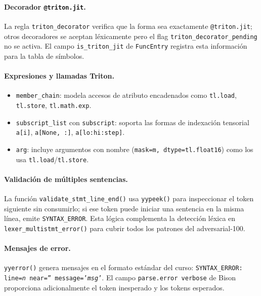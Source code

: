 \paragraph{Decorador \texttt{@triton.jit}.}
La regla \texttt{triton\_decorator} verifica que la forma sea exactamente
\texttt{@triton.jit}; otros decoradores se aceptan léxicamente pero el flag
\texttt{triton\_decorator\_pending} no se activa. El campo
\texttt{is\_triton\_jit} de \texttt{FuncEntry} registra esta información
para la tabla de símbolos.

\paragraph{Expresiones y llamadas Triton.}
\begin{itemize}
  \item \texttt{member\_chain}: modela accesos de atributo encadenados como
    \texttt{tl.load}, \texttt{tl.store}, \texttt{tl.math.exp}.
  \item \texttt{subscript\_list} con \texttt{subscript}: soporta las formas de
    indexación tensorial \texttt{a[i]}, \texttt{a[None, :]}, \texttt{a[lo:hi:step]}.
  \item \texttt{arg}: incluye argumentos con nombre (\texttt{mask=m, dtype=tl.float16})
    como los usa \texttt{tl.load}/\texttt{tl.store}.
\end{itemize}

\paragraph{Validación de múltiples sentencias.}
La función \texttt{validate\_stmt\_line\_end()} usa \texttt{yypeek()} para
inspeccionar el token siguiente sin consumirlo; si ese token puede iniciar una
sentencia en la misma línea, emite \texttt{SYNTAX\_ERROR}. Esta lógica
complementa la detección léxica en \texttt{lexer\_multistmt\_error()} para
cubrir todos los patrones del adversarial-100.

\paragraph{Mensajes de error.}
\texttt{yyerror()} genera mensajes en el formato estándar del curso:
\texttt{SYNTAX\_ERROR: line=\textit{n} near='' message='\textit{msg}'}. El
campo \texttt{parse.error verbose} de Bison proporciona adicionalmente el token
inesperado y los tokens esperados.

